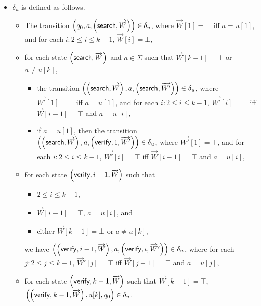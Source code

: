 \begin{definition}
\begin{itemize}
	\item $\delta_{u}$ is defined as follows.
	\begin{itemize}
		\item The transition $\left(q_0, a, \left(\mathsf{search}, \overrightarrow{W}\right)\right) \in \delta_u$, where $\overrightarrow{W}[1]=\top$ iff $a = u[1]$, and for each $i: 2 \le i \le k-1$, $\overrightarrow{W}[i] = \bot$,
		\item for each state $\left(\mathsf{search}, \overrightarrow{W} \right)$ and $a \in \Sigma$ such that $\overrightarrow{W}[k-1] = \bot$ or $a \neq u[k]$,
		\begin{itemize}
			\item the transition $\left(\left(\mathsf{search}, \overrightarrow{W} \right), a, \left(\mathsf{search}, \overrightarrow{W'} \right)\right) \in \delta_u$, where $\overrightarrow{W'}[1] = \top$ iff $a = u[1]$, and for each $i: 2 \le i \le k-1$, $\overrightarrow{W'}[i] =\top$ iff $\overrightarrow{W}[{i-1}] = \top$ and $a = u[i]$,
			\item if $a = u[1]$, then the transition $\left(\left(\mathsf{search}, \overrightarrow{W} \right), a, \left(\mathsf{verify}, 1, \overrightarrow{W'} \right)\right) \in \delta_u$, where $\overrightarrow{W'}[1]=\top$,  and for each $i: 2 \le i \le k-1$, $\overrightarrow{W'}[i] =\top$ iff $\overrightarrow{W}[{i-1}] = \top$ and $a = u[i]$,
		\end{itemize}
		\item for each state $\left(\mathsf{verify}, i-1, \overrightarrow{W} \right)$ such that 
		\begin{itemize}
			\item $2 \le i \le k-1$,
			\item $\overrightarrow{W}[i-1]=\top$, $a = u[i]$, and
			\item either $\overrightarrow{W}[k-1]=\bot$ or $a \neq u[k]$, 
		\end{itemize}
		we have $\left(\left(\mathsf{verify}, i-1, \overrightarrow{W} \right), a, \left(\mathsf{verify}, i, \overrightarrow{W}' \right)\right) \in \delta_u$, where for each $j: 2 \le j \le k-1$, $\overrightarrow{W}'[j] = \top$ iff $\overrightarrow{W}[j-1]=\top$ and $a = u[j]$, 
		\item for each state $\left(\mathsf{verify}, k-1, \overrightarrow{W} \right)$ such that $\overrightarrow{W}[k-1]=\top$, $\left(\left(\mathsf{verify}, k-1, \overrightarrow{W} \right), u[k], q_0\right) \in \delta_u$.

\end{itemize}
\end{itemize}
\end{definition}
